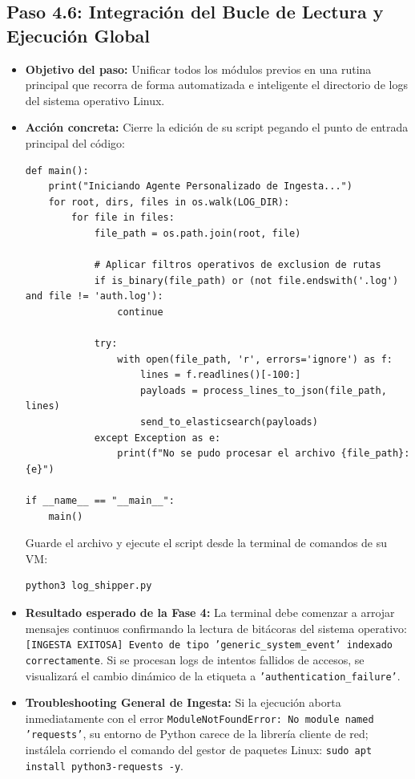 \documentclass[
  coursetitle={Cómputo Nube y Tecnologías Emergentes},
  coursehours={96},
  coursedate={Verano 2026},
  doctype={Práctica},
  otherlangs={english,french},
  authorname={Lázaro},
  authorsurname={Bustio-Martínez},
  authortitle={PhD},
  role={Profesor Investigador},
  email={lbustio@inaoe.mx},
  phone={5559504000},
  ext={7459},
  institution={Instituto Nacional de Astrofísica, Óptica y Electrónica (INAOE)},
  department={Maestría en Ciencias en Tecnologías de Seguridad},
  address={Luis Enrique Erro 1, Sta. Ma. Tonantzintla, San Andrés Cholula, CP 72840, Puebla, México},
  margin={0.5in}
]{../../lbustio_lecture_notes}
\begin{document}
\subsection{Paso 4.6: Integración del Bucle de Lectura y Ejecución Global}
\begin{itemize}
    \item \textbf{Objetivo del paso:} Unificar todos los módulos previos en una rutina principal que recorra de forma automatizada e inteligente el directorio de logs del sistema operativo Linux.
    \item \textbf{Acción concreta:} Cierre la edición de su script pegando el punto de entrada principal del código:
\begin{verbatim}
def main():
    print("Iniciando Agente Personalizado de Ingesta...")
    for root, dirs, files in os.walk(LOG_DIR):
        for file in files:
            file_path = os.path.join(root, file)
            
            # Aplicar filtros operativos de exclusion de rutas
            if is_binary(file_path) or (not file.endswith('.log') and file != 'auth.log'):
                continue
                
            try:
                with open(file_path, 'r', errors='ignore') as f:
                    lines = f.readlines()[-100:]
                    payloads = process_lines_to_json(file_path, lines)
                    send_to_elasticsearch(payloads)
            except Exception as e:
                print(f"No se pudo procesar el archivo {file_path}: {e}")

if __name__ == "__main__":
    main()
\end{verbatim}
    Guarde el archivo y ejecute el script desde la terminal de comandos de su VM:
\begin{verbatim}
python3 log_shipper.py
\end{verbatim}
    \item \textbf{Resultado esperado de la Fase 4:} La terminal debe comenzar a arrojar mensajes continuos confirmando la lectura de bitácoras del sistema operativo: \texttt{[INGESTA EXITOSA] Evento de tipo 'generic\_system\_event' indexado correctamente}. Si se procesan logs de intentos fallidos de accesos, se visualizará el cambio dinámico de la etiqueta a \texttt{'authentication\_failure'}.
    \item \textbf{Troubleshooting General de Ingesta:} Si la ejecución aborta inmediatamente con el error \texttt{ModuleNotFoundError: No module named 'requests'}, su entorno de Python carece de la librería cliente de red; instálela corriendo el comando del gestor de paquetes Linux: \texttt{sudo apt install python3-requests -y}.
\end{itemize}
\end{document}
